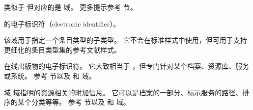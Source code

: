 \begin{fieldlist}

类似于  但对应的是  域。
更多提示参考  节。




 的电子标识符（electronic identifier）。




该域用于指定一个条目类型的子类型。
它不会在标准样式中使用，但可用于支持更细化的条目类型集的参考文献样式。




在线出版物的电子标识符。
它大致相当于 ，但专门针对某个档案、资源库、服务或系统。
参考  节以及  和  域。




域  域指明的资源相关的附加信息。
它可以是档案的一部分、标示服务的路径、排序的某个分类等等。
参考  节以及  和  域。




\end{fieldlist}
